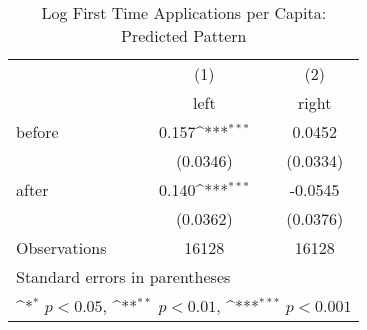 \begin{table}[htbp]\centering
\def\sym#1{\ifmmode^{#1}\else\(^{#1}\)\fi}
\caption{Log First Time Applications per Capita: Predicted Pattern}
\begin{tabular}{l*{2}{c}}
\hline\hline
                    &\multicolumn{1}{c}{(1)}&\multicolumn{1}{c}{(2)}\\
                    &\multicolumn{1}{c}{left}&\multicolumn{1}{c}{right}\\
\hline
before              &       0.157\sym{***}&      0.0452         \\
                    &    (0.0346)         &    (0.0334)         \\
[1em]
after               &       0.140\sym{***}&     -0.0545         \\
                    &    (0.0362)         &    (0.0376)         \\
\hline
Observations        &       16128         &       16128         \\
\hline\hline
\multicolumn{3}{l}{\footnotesize Standard errors in parentheses}\\
\multicolumn{3}{l}{\footnotesize \sym{*} \(p<0.05\), \sym{**} \(p<0.01\), \sym{***} \(p<0.001\)}\\
\end{tabular}
\end{table}
